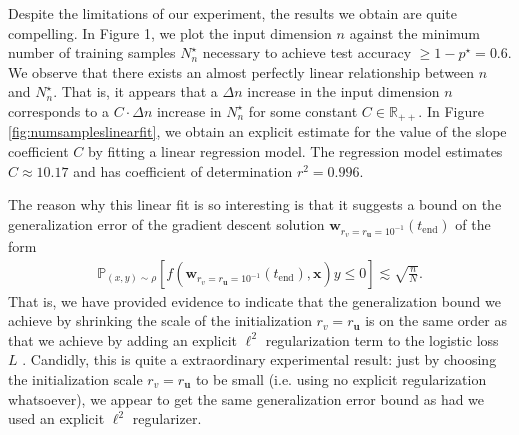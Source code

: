 \documentclass{article}
\begin{document}
Despite the limitations of our experiment, the results we obtain are quite compelling. In Figure 1, we plot the input dimension $n$ against the minimum number of training samples $N_n^{\star}$ necessary to achieve test accuracy $\geq 1-p^{\star} = 0.6$. We observe that there exists an almost perfectly linear relationship between $n$ and $N_n^{\star}$. That is, it appears that a $\Delta n$ increase in the input dimension $n$ corresponds to a $C \cdot \Delta n$ increase in $N_n^{\star}$ for some constant $C \in \mathbb{R}_{++}$. In Figure \ref{fig:numsampleslinearfit}, we obtain an explicit estimate for the value of the slope coefficient $C$ by fitting a linear regression model. The regression model estimates $C \approx 10.17$ and has coefficient of determination $r^2 = 0.996$.

The reason why this linear fit is so interesting is that it suggests a bound on the generalization error of the gradient descent solution $\boldsymbol{w}_{r_v = r_{\boldsymbol{u}}= 10^{-1}}(t_{\text{end}})$ of the form 
\begin{align*}
   \mathbb{P}_{(x,y) \sim \rho}[f(\boldsymbol{w}_{r_v = r_{\boldsymbol{u}} = 10^{-1}}(t_{\text{end}}), \boldsymbol{x})y \leq 0] \lesssim \sqrt{\frac{n}{N}}.
\end{align*}
That is, we have provided evidence to indicate that the generalization bound we achieve by shrinking the scale of the initialization $r_v = r_{\boldsymbol{u}}$ is on the same order as that we achieve by adding an explicit $\ell^2$ regularization term to the logistic loss $L$ \cite{wei2019regularization}. Candidly, this is quite a extraordinary experimental result: just by choosing the initialization scale $r_v = r_{\boldsymbol{u}}$ to be small (i.e. using no explicit regularization whatsoever), we appear to get the same generalization error bound as had we used an explicit $\ell^2$ regularizer.
\end{document}

